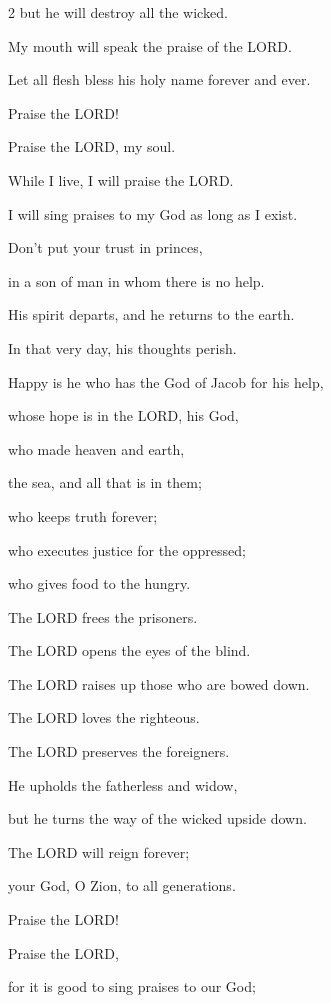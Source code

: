 \begin{multicols}{2}
	but he will destroy all the wicked.
	
	
	\myverse{}My mouth will speak the praise of the LORD.
	
	Let all flesh bless his holy name forever and ever.
	
	
	
	\mychapter{} \myverse*{}Praise the LORD!
	
	\quad\quad\quad Praise the LORD, my soul.
	
	
	\myverse{}While I live, I will praise the LORD.
	
	I will sing praises to my God as long as I exist.
	
	
	\myverse{}Don’t put your trust in princes,
	
	in a son of man in whom there is no help.
	
	
	\myverse{}His spirit departs, and he returns to the earth.
	
	In that very day, his thoughts perish.
	
	
	\myverse{}Happy is he who has the God of Jacob for his help,
	
	whose hope is in the LORD, his God,
	
	
	\myverse{}who made heaven and earth,
	
	the sea, and all that is in them;
	
	who keeps truth forever;
	
	
	\myverse{}who executes justice for the oppressed;
	
	who gives food to the hungry.
	
	The LORD frees the prisoners.
	
	
	\myverse{}The LORD opens the eyes of the blind.
	
	The LORD raises up those who are bowed down.
	
	The LORD loves the righteous.
	
	
	\myverse{}The LORD preserves the foreigners.
	
	He upholds the fatherless and widow,
	
	but he turns the way of the wicked upside down.
	
	
	\myverse{}The LORD will reign forever;
	
	your God, O Zion, to all generations.
	
	Praise the LORD!
	
	
	
	\mychapter{} \myverse*{}Praise the LORD,
	
	\quad\quad\quad for it is good to sing praises to our God;
	

\end{multicols}
